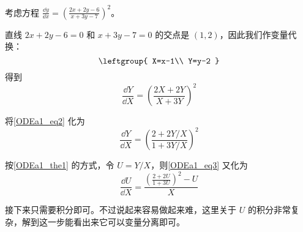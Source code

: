 \begin{example}{}
考虑方程 $\frac{\dd y}{\dd x}=(\frac{2x+2y-6}{x+3y-7})^2$。

直线 $2x+2y-6=0$ 和 $x+3y-7=0$ 的交点是 $(1, 2)$，因此我们作变量代换：
\begin{equation}
\leftgroup{
    X=x-1\\
    Y=y-2
}
\end{equation}
得到
\begin{equation}\label{ODEa1_eq2}
\frac{\dd Y}{\dd X}=(\frac{2X+2Y}{X+3Y})^2
\end{equation}

将\autoref{ODEa1_eq2} 化为
\begin{equation}\label{ODEa1_eq3}
\frac{\dd Y}{\dd X}=(\frac{2+2Y/X}{1+3Y/X})^2
\end{equation}

按\autoref{ODEa1_the1} 的方式，令 $U=Y/X$，则\autoref{ODEa1_eq3} 又化为
\begin{equation}
\frac{\dd U}{\dd X}=\frac{(\frac{2+2U}{1+3U})^2-U}{X}
\end{equation}

接下来只需要积分即可。不过说起来容易做起来难，这里关于 $U$ 的积分非常复杂，解到这一步能看出来它可以变量分离即可。

\end{example}









